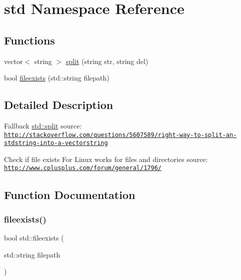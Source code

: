 \hypertarget{namespacestd}{}\section{std Namespace Reference}
\label{namespacestd}
\subsection*{Functions}
\begin{DoxyCompactItemize}
\item 
vector$<$ string $>$ \hyperlink{namespacestd_afbda037ce4502f9a197deba4a43bada9}{split} (string str, string del)
\item 
bool \hyperlink{namespacestd_ae966385e77759fc59768aa9bc280f3d9}{fileexists} (std\+::string filepath)
\end{DoxyCompactItemize}


\subsection{Detailed Description}
Fallback \hyperlink{namespacestd_afbda037ce4502f9a197deba4a43bada9}{std\+::split} source\+: \href{http://stackoverflow.com/questions/5607589/right-way-to-split-an-stdstring-into-a-vectorstring}{\tt http\+://stackoverflow.\+com/questions/5607589/right-\/way-\/to-\/split-\/an-\/stdstring-\/into-\/a-\/vectorstring}

Check if file exists For Linux works for files and directories source\+: \href{http://www.cplusplus.com/forum/general/1796/}{\tt http\+://www.\+cplusplus.\+com/forum/general/1796/} 

\subsection{Function Documentation}
\mbox{\label{namespacestd_ae966385e77759fc59768aa9bc280f3d9}} 
\subsubsection{\texorpdfstring{fileexists()}{fileexists()}}
{\footnotesize\ttfamily bool std\+::fileexists (\begin{DoxyParamCaption}\item[{std\+::string}]{filepath }\end{DoxyParamCaption})\hspace{0.3cm}{\ttfamily [inline]}}

